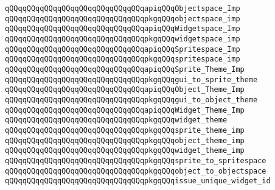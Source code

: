 \newline
\verb|qQQqqQQqqQQqqQQqqQQqqQQqqQQqqQQqapiqQQqObjectspace_Imp|\newline
\verb|qQQqqQQqqQQqqQQqqQQqqQQqqQQqqQQqpkgqQQqobjectspace_imp|\newline
\newline
\newline
\verb|qQQqqQQqqQQqqQQqqQQqqQQqqQQqqQQqapiqQQqWidgetspace_Imp|\newline
\verb|qQQqqQQqqQQqqQQqqQQqqQQqqQQqqQQqpkgqQQqwidgetspace_imp|\newline
\newline
\newline
\verb|qQQqqQQqqQQqqQQqqQQqqQQqqQQqqQQqapiqQQqSpritespace_Imp|\newline
\verb|qQQqqQQqqQQqqQQqqQQqqQQqqQQqqQQqpkgqQQqspritespace_imp|\newline
\newline
\newline
\verb|qQQqqQQqqQQqqQQqqQQqqQQqqQQqqQQqapiqQQqSprite_Theme_Imp|\newline
\verb|qQQqqQQqqQQqqQQqqQQqqQQqqQQqqQQqpkgqQQqgui_to_sprite_theme|\newline
\newline
\verb|qQQqqQQqqQQqqQQqqQQqqQQqqQQqqQQqapiqQQqObject_Theme_Imp|\newline
\verb|qQQqqQQqqQQqqQQqqQQqqQQqqQQqqQQqpkgqQQqgui_to_object_theme|\newline
\newline
\verb|qQQqqQQqqQQqqQQqqQQqqQQqqQQqqQQqapiqQQqWidget_Theme_Imp|\newline
\verb|qQQqqQQqqQQqqQQqqQQqqQQqqQQqqQQqpkgqQQqwidget_theme|\newline
\newline
\newline
\verb|qQQqqQQqqQQqqQQqqQQqqQQqqQQqqQQqpkgqQQqsprite_theme_imp|\newline
\verb|qQQqqQQqqQQqqQQqqQQqqQQqqQQqqQQqpkgqQQqobject_theme_imp|\newline
\verb|qQQqqQQqqQQqqQQqqQQqqQQqqQQqqQQqpkgqQQqwidget_theme_imp|\newline
\newline
\verb|qQQqqQQqqQQqqQQqqQQqqQQqqQQqqQQqpkgqQQqsprite_to_spritespace|\newline
\verb|qQQqqQQqqQQqqQQqqQQqqQQqqQQqqQQqpkgqQQqobject_to_objectspace|\newline
\verb|qQQqqQQqqQQqqQQqqQQqqQQqqQQqqQQqpkgqQQqissue_unique_widget_id|\newline
\newline
